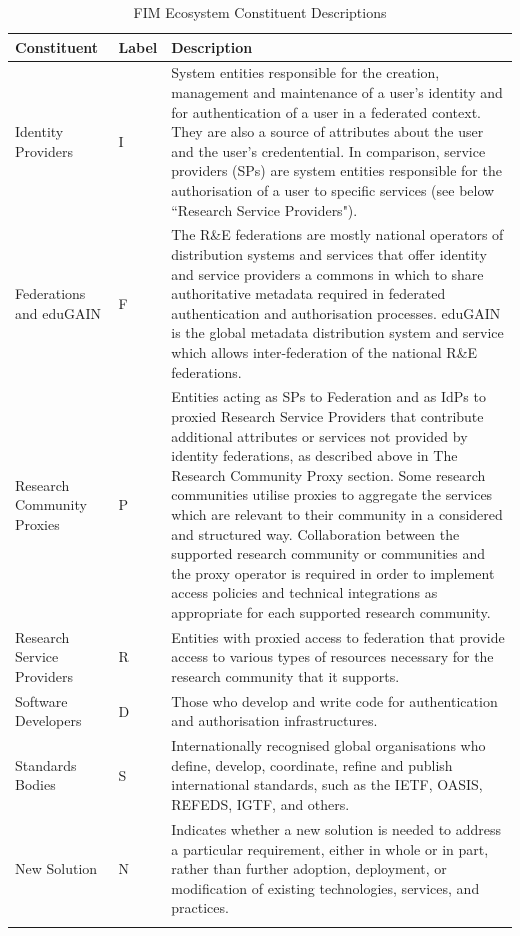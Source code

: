 \documentclass[fleqn,10pt]{wlscirep}
\begin{document}
{\begin{center}
\begin{longtable}{|p{3cm}|p{1cm}|p{10cm}|} 
\hline
Constituent
&Label
&Description \\
\hline\hline
\endhead
Identity Providers
&I
&System entities responsible for the creation, management and maintenance of a user’s identity and for authentication of a user in a federated context. They are also a source of attributes about the user and the user’s credentential. In comparison, service providers (SPs) are system entities responsible for the authorisation of a user to specific services (see below ``Research Service Providers").\\
\hline
Federations and eduGAIN
&F
&The R\&E federations are mostly national operators of distribution systems and services that offer identity and service providers a commons in which to share authoritative metadata required in federated authentication and authorisation processes. eduGAIN is the global metadata distribution system and service which allows inter-federation of the national R\&E federations. \\
\hline
Research Community Proxies
&P
&Entities acting as SPs to Federation and as IdPs to proxied Research Service Providers that contribute additional attributes or services not provided by identity federations, as described above in The Research Community Proxy section. Some research communities utilise proxies to aggregate the services which are relevant to their community in a considered and structured way. Collaboration between the supported research community or communities and the proxy operator is required in order to implement access policies and technical integrations as appropriate for each supported research community. \\
\hline
Research Service Providers
&R
&Entities with proxied access to federation that provide access to various types of resources necessary for the research community that it supports.\\
\hline
Software Developers
&D
&Those who develop and write code for authentication and authorisation infrastructures. \\
\hline
Standards Bodies
&S
&Internationally recognised global organisations who define, develop, coordinate, refine and publish international standards, such as the IETF, OASIS, REFEDS, IGTF, and others.\\
\hline
New Solution
&N
&Indicates whether a new solution is needed to address a particular requirement, either in whole or in part, rather than further adoption, deployment, or modification of existing technologies, services, and practices.\\
 \hline
\caption{FIM Ecosystem Constituent Descriptions}
\label{tab:ecosystem}
\end{longtable}
\end{center}

}
\end{document}

